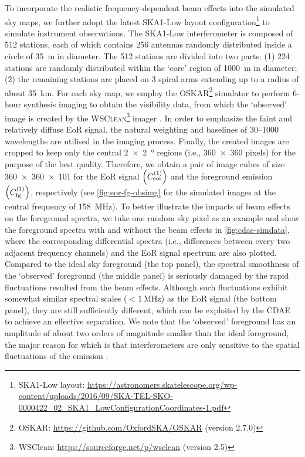 To incorporate the realistic frequency-dependent beam effects into the
simulated sky maps, we further adopt the latest SKA1-Low layout
configuration\footnote{\raggedright%
  SKA1-Low layout:
  \url{https://astronomers.skatelescope.org/wp-content/uploads/2016/09/SKA-TEL-SKO-0000422_02_SKA1_LowConfigurationCoordinates-1.pdf}}
to simulate instrument observations.
The SKA1-Low interferometer is composed of 512 stations, each of which
contains 256 antennas randomly distributed inside a circle of
\SI{35}{\meter} in diameter.
The 512 stations are divided into two parts:
(1) 224 stations are randomly distributed within the `core' region of
\SI{1000}{\meter} in diameter;
(2) the remaining stations are placed on 3 spiral arms extending up to a
radius of about \SI{35}{\kilo\meter}.
For each sky map, we employ the \textsc{OSKAR}\footnote{%
  OSKAR: \url{https://github.com/OxfordSKA/OSKAR} (version 2.7.0)}
simulator \cite{mort2010} to perform 6-hour synthesis imaging
to obtain the visibility data, from which the `observed'
image is created by the \textsc{WSClean}\footnote{%
  WSClean: \url{https://sourceforge.net/p/wsclean} (version 2.5)}
imager \cite{offringa2014}.
In order to emphasize the faint and relatively diffuse EoR signal, the
natural weighting and baselines of \numrange{30}{1000} wavelengths are
utilised in the imaging process.
Finally, the created images are cropped to keep only the central
\SI{2 x 2}{\degree} regions (i.e., \num{360 x 360} pixels) for the
purpose of the best quality.
Therefore, we obtain a pair of image cubes of size
\num{360 x 360 x 101} for the EoR signal $\left( C_{\mathrm{eor}}^{(1)} \right)$
and the foreground emission $\left( C_{\mathrm{fg}}^{(1)} \right)$, respectively
(see \autoref{fig:eor-fg-obsimg} for the simulated images at the
central frequency of \SI{158}{\MHz}).
To better illustrate the impacts of beam effects on the foreground spectra,
we take one random sky pixel as an example and show the foreground
spectra with and without the beam effects in \autoref{fig:cdae-simdata}, where
the corresponding differential spectra (i.e., differences between every
two adjacent frequency channels) and the EoR signal spectrum are also
plotted.
Compared to the ideal sky foreground (the top panel), the spectral
smoothness of the `observed' foreground (the middle panel) is seriously
damaged by the rapid fluctuations resulted from the beam effects.
Although such fluctuations exhibit somewhat similar spectral scales
($< \SI{1}{\MHz}$) as the EoR signal (the bottom panel), they are
still sufficiently different, which can be exploited by the CDAE to achieve
an effective separation.
We note that the `observed' foreground has an amplitude of about two orders
of magnitude smaller than the ideal foreground, the major reason for which
is that interferometers are only sensitive to the spatial fluctuations of
the emission \cite{braun1985}.

